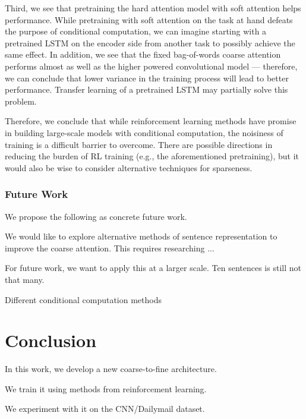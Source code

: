 \documentclass[12pt]{report}
\begin{document}
Third, we see that pretraining the hard attention model with soft attention helps performance. While pretraining with soft attention on the task at hand defeats the purpose of conditional computation, we can imagine starting with a pretrained LSTM on the encoder side from another task to possibly achieve the same effect.
In addition, we see that the fixed bag-of-words coarse attention performs almost as well as the higher powered convolutional model --- therefore, we can conclude that lower variance in the training process will lead to better performance. Transfer learning of a pretrained LSTM may partially solve this problem.

Therefore, we conclude that while reinforcement learning methods have promise in building large-scale models with conditional computation, the noisiness of training is a difficult barrier to overcome. There are possible directions in reducing the burden of RL training (e.g., the aforementioned pretraining), but it would also be wise to consider alternative techniques for sparseness.


\subsection{Future Work}

We propose the following as concrete future work.

We would like to explore alternative methods of sentence representation to improve the coarse attention. This requires researching ...

For future work, we want to apply this at a larger scale. Ten sentences is still not that many.


Different conditional computation methods

\chapter{Conclusion}
\label{chap:conclusion}

In this work, we develop a new coarse-to-fine architecture.

We train it using methods from reinforcement learning.

We experiment with it on the CNN/Dailymail dataset.



\end{document}
